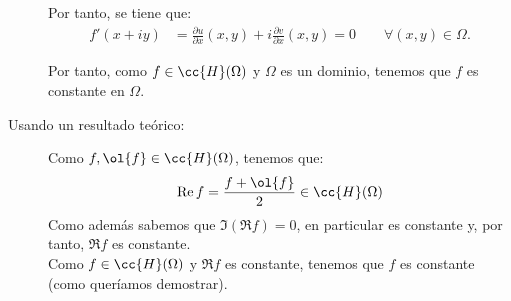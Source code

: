 \begin{ejercicio}
\begin{description}
    Por tanto, se tiene que:
    \begin{align*}
        f'(x+iy) &= \frac{\partial u}{\partial x}(x,y) + i\frac{\partial v}{\partial x}(x,y) = 0\qquad \forall (x,y)\in\Omega.
    \end{align*}

    Por tanto, como $f\in \cc{H}(\Omega)$ y $\Omega$ es un dominio, tenemos que $f$ es constante en $\Omega$.

    \item[Usando un resultado teórico:]
    
    Como $f,\ol{f}\in \cc{H}(\Omega)$, tenemos que:
    \begin{equation*}
        \Re f = \dfrac{f+\ol{f}}{2}\in \cc{H}(\Omega)
    \end{equation*}
    Como además sabemos que $\Im(\Re f)=0$, en particular es constante y, por tanto, $\Re f$ es constante.\\

    Como $f\in \cc{H}(\Omega)$ y $\Re f$ es constante, tenemos que $f$ es constante (como queríamos demostrar).
    \end{description}
\end{ejercicio}

